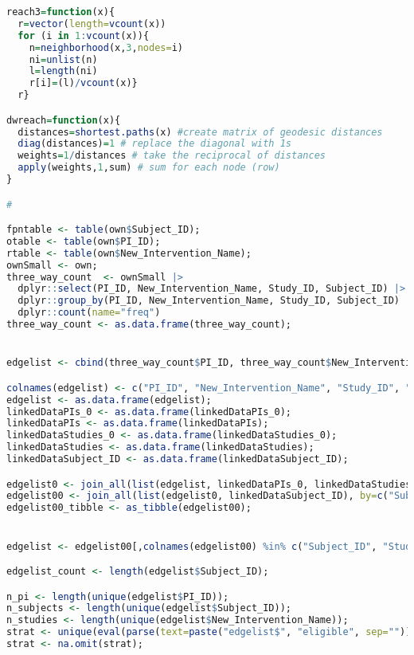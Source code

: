 \documentclass{article}
\begin{document}
\begin{lstlisting}[language=R]
reach3=function(x){
  r=vector(length=vcount(x))
  for (i in 1:vcount(x)){
    n=neighborhood(x,3,nodes=i)
    ni=unlist(n)
    l=length(ni)
    r[i]=(l)/vcount(x)}
  r}

dwreach=function(x){
  distances=shortest.paths(x) #create matrix of geodesic distances
  diag(distances)=1 # replace the diagonal with 1s
  weights=1/distances # take the reciprocal of distances
  apply(weights,1,sum) # sum for each node (row)
}

#

fpntable <- table(own$Subject_ID);
otable <- table(own$PI_ID);
rtable <- table(own$New_Intervention_Name);
ownSmall <- own;
three_way_count  <- ownSmall |>
  dplyr::select(PI_ID, New_Intervention_Name, Study_ID, Subject_ID) |>
  dplyr::group_by(PI_ID, New_Intervention_Name, Study_ID, Subject_ID) |>
  dplyr::count(name="freq")
three_way_count <- as.data.frame(three_way_count);


edgelist <- cbind(three_way_count$PI_ID, three_way_count$New_Intervention_Name, three_way_count$Study_ID, three_way_count$Subject_ID, three_way_count$freq);

colnames(edgelist) <- c("PI_ID", "New_Intervention_Name", "Study_ID", "Subject_ID", "freq");
edgelist <- as.data.frame(edgelist);
linkedDataPIs_0 <- as.data.frame(linkedDataPIs_0);
linkedDataPIs <- as.data.frame(linkedDataPIs);
linkedDataStudies_0 <- as.data.frame(linkedDataStudies_0);
linkedDataStudies <- as.data.frame(linkedDataStudies);
linkedDataSubject_ID <- as.data.frame(linkedDataSubject_ID);

edgelist0 <- join_all(list(edgelist, linkedDataPIs_0, linkedDataStudies_0), by = c("New_Intervention_Name", "Study_ID"), type = "left", match = "first");
edgelist00 <- join_all(list(edgelist0, linkedDataSubject_ID), by=c("Subject_ID", "New_Intervention_Name", "Study_ID"), type="left", match = "first");
edgelist00_tibble <- as_tibble(edgelist00);


edgelist <- edgelist00[,colnames(edgelist00) %in% c("Subject_ID", "Study_ID", "Enrolled_Date_Time", "New_Intervention_Name", "PI_ID", "Num_Patients", "eligible", "Randomized", "Combination", "freq", "Department", "Enrolled_Date_Time", "Status_Change_Date_Time", "New_Int_Name", "AE_Grade_3_Plus", "Age_65")];

edgelist_count <- length(edgelist$Subject_ID);

n_pi <- length(unique(edgelist$PI_ID));
n_subjects <- length(unique(edgelist$Subject_ID));
n_studies <- length(unique(edgelist$New_Intervention_Name));
strat <- unique(eval(parse(text=paste("edgelist$", "eligible", sep=""))));
strat <- na.omit(strat);


\end{lstlisting}
\end{document}

